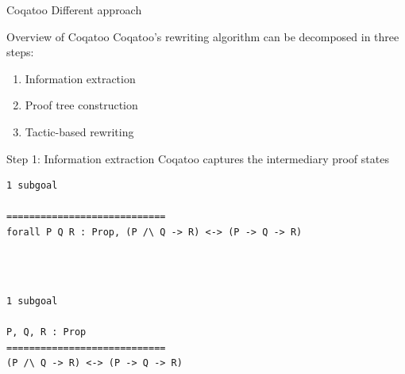 \documentclass[pdf]{beamer}
\begin{document}
\begin{frame}{Coqatoo}
Different approach
\end{frame}

\begin{frame}{Overview of Coqatoo}
    Coqatoo's rewriting algorithm can be decomposed in three steps:
    \begin{enumerate}
        \item Information extraction
        \item Proof tree construction
        \item Tactic-based rewriting
    \end{enumerate}
\end{frame}


\begin{frame}[fragile]{Step 1: Information extraction}
Coqatoo captures the intermediary proof states
\begin{adjustbox}{minipage=\linewidth,bgcolor=coqatoo-gray,trim=-3pt 5pt -3pt 5pt}
\begin{lstlisting}[label=listing:before-intros]
1 subgoal

============================
forall P Q R : Prop, (P /\ Q -> R) <-> (P -> Q -> R)
\end{lstlisting}
\end{adjustbox}
~\\~\\
\begin{adjustbox}{minipage=\linewidth,bgcolor=coqatoo-gray,trim=-3pt 5pt -3pt 5pt}
\begin{lstlisting}[label=listing:after-intros]
1 subgoal

P, Q, R : Prop
============================
(P /\ Q -> R) <-> (P -> Q -> R)
\end{lstlisting}
\end{adjustbox}
\end{frame}
\end{document}

